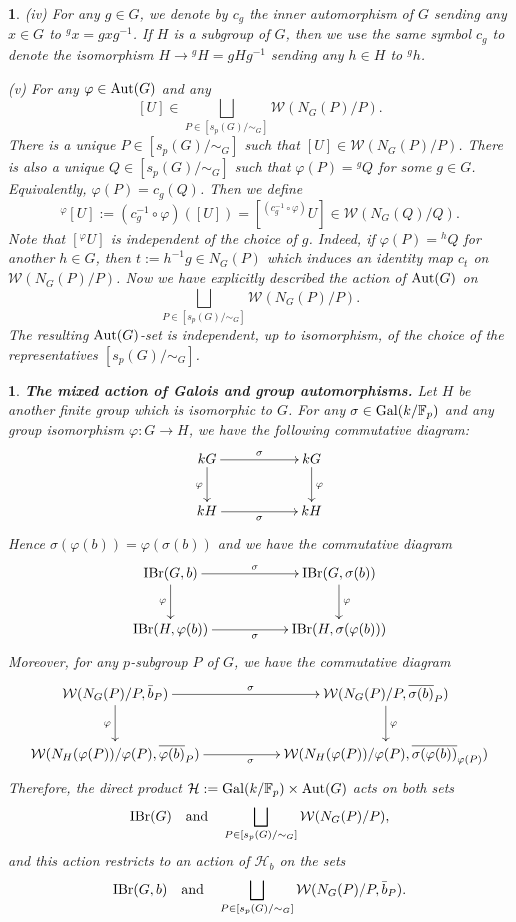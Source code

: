 \documentclass[preprint,12pt,3p]{elsarticle}
\newtheorem{void}[theorem]{}
\def\IBr{{\rm IBr}}
\def\Aut{{\rm Aut}}
\def\Gal{{\rm Gal}}
\def\W{\mathcal{W}}
\def\H{\mathcal{H}}
\def\F{\mathbb{F}}
\begin{document}
\begin{void}
{(iv) For any $g\in G$, we denote by $c_g$ the inner automorphism of $G$ sending any $x\in G$ to ${}^gx=gxg^{-1}$. If $H$ is a subgroup of $G$, then we use the same symbol $c_g$ to denote the isomorphism $H\to {}^gH=gHg^{-1}$ sending any $h\in H$ to ${}^gh$. 

(v) For any $\varphi\in \Aut(G)$ and any $$[U]\in \bigsqcup_{P\in [s_p(G)/\sim_G]}\W(N_G(P)/P).$$ There is a unique $P\in [s_p(G)/\sim_G]$ such that $[U]\in \W(N_G(P)/P)$. There is also a unique $Q\in [s_p(G)/\sim_G]$ such that $\varphi(P)={}^gQ$ for some $g\in G$. Equivalently, $\varphi(P)=c_g(Q)$. Then we define
$${}^\varphi[U]:=(c_g^{-1}\circ \varphi)([U])=[{}^{(c_g^{-1}\circ \varphi)}U]\in \W(N_G(Q)/Q).$$
Note that $[{}^\varphi U]$ is independent of the choice of $g$. Indeed, if $\varphi(P)={}^hQ$ for another $h\in G$, then $t:=h^{-1}g\in N_G(P)$ which induces an identity map $c_t$ on $\W(N_G(P)/P)$. Now we have explicitly described the action of $\Aut(G)$ on 
$$\bigsqcup_{P\in [s_p(G)/\sim_G]}\W(N_G(P)/P).$$
The resulting $\Aut(G)$-set is independent, up to isomorphism, of the choice of the representatives $[s_p(G)/\sim_G]$.

}
\end{void}




\begin{void}
{\rm \textbf{The mixed action of Galois and group automorphisms.} Let $H$ be another finite group which is isomorphic to $G$. For any $\sigma\in \Gal(k/\F_p)$ and any group isomorphism $\varphi:G\to H$, we have the following commutative diagram:
	$$\xymatrix{kG\ar[rr]^{\sigma}\ar[d]_{\varphi} &  & kG\ar[d]^{\varphi}\\
		kH \ar[rr]_{\sigma}  &   &  kH 
	}$$
Hence $\sigma(\varphi(b))=\varphi(\sigma(b))$ and we have the commutative diagram
	$$\xymatrix{\IBr(G,b)\ar[rr]^{\sigma}\ar[d]_{\varphi} &  & \IBr(G,\sigma(b))\ar[d]^{\varphi}\\
 \IBr(H,\varphi(b)) \ar[rr]_{\sigma}  &   &  \IBr(H,\sigma(\varphi(b))) 
}$$
Moreover, for any $p$-subgroup $P$ of $G$, we have the commutative diagram	
$$\xymatrix{\W(N_G(P)/P,\bar{b}_P)\ar[rr]^{\sigma}\ar[d]_{\varphi} &  & \W(N_G(P)/P,\overline{\sigma(b)}_P)\ar[d]^{\varphi}\\
	\W(N_H(\varphi(P))/\varphi(P),\overline{\varphi(b)}_P) \ar[rr]_{\sigma}  &   &  \W(N_H(\varphi(P))/\varphi(P),\overline{\sigma(\varphi(b))}_{\varphi(P)}) 
}$$
Therefore, the direct product $\H:=\Gal(k/\F_p)\times \Aut(G)$ acts on both sets 
$$\IBr(G)~~~{\rm and}~~~\bigsqcup_{P\in [s_p(G)/\sim_G]}\W(N_G(P)/P),$$
and this action restricts to an action of $\H_b$ on the sets 
$$\IBr(G,b)~~~{\rm and}~~~\bigsqcup_{P\in [s_p(G)/\sim_G]}\W(N_G(P)/P,\bar{b}_P).$$

}
\end{void}
\end{document}
